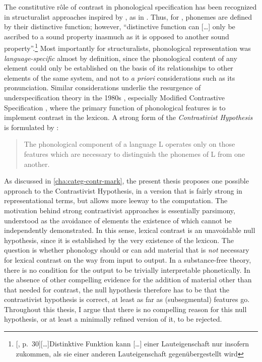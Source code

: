 The constitutive rôle of contrast in phonological specification has been recognized in structuralist approaches inspired by \citet{saussure16:_cours}, as in \citet{Tru39,mart55,jakobson56:_fundam,hjelmslev43:_omkrin,hjelmslev75:_resum}. Thus, for \citet{Tru39}, phonemes are defined by their distinctive function; however, \enquote{distinctive function can [\ldots] only be ascribed to a sound property inasmuch as it is opposed to another sound property}.\footnote{[\citealp{Tru39}, p.~30][\ldots]{Distinktive Funktion kann [\ldots] einer Lauteigenschaft nur insofern zukommen, als sie einer anderen Lauteigenschaft gegenübergestellt wird}} Most importantly for structuralists, phonological representation was \emph{language\hyp specific} almost by definition, since the phonological content of any element could only be established on the basis of its relationships to other elements of the same system, and not to \emph{a priori} considerations such as its pronunciation. Similar considerations underlie the resurgence of underspecification theory in the 1980s \citep{archangeli1988,steriade87:_redun,steriade-hbk}, especially Modified Contrastive Specification \citep{torontoschool,dresher-hier,dresher09,currie07}, where the primary function of phonological features is to implement contrast in the lexicon. A strong form of the \emph{Contrastivist Hypothesis} is formulated by \citet[p.~20]{currie07}: \blockquote{The phonological component of a language L operates only on those features which are necessary to distinguish the phonemes of L from one another.}

As discussed in \cref{cha:categ-contr-mark}, the present thesis proposes one possible approach to the Contrastivist Hypothesis, in a version that is fairly strong in representational terms, but allows more leeway to the computation. The motivation behind strong contrastivist approaches is essentially parsimony, understood as the avoidance of elements the existence of which cannot be independently demonstrated. In this sense, lexical contrast is an unavoidable null hypothesis, since it is established by the very existence of the lexicon. The question is whether phonology should or can add material that is \emph{not} necessary for lexical contrast on the way from input to output. In a substance\hyp free theory, there is no condition for the output to be trivially interpretable phonetically. In the absence of other compelling evidence for the addition of material other than that needed for contrast, the null hypothesis therefore has to be that the contrastivist hypothesis is correct, at least as far as (subsegmental) features go. Throughout this thesis, I argue that there is no compelling reason for this null hypothesis, or at least a minimally refined version of it, to be rejected.

